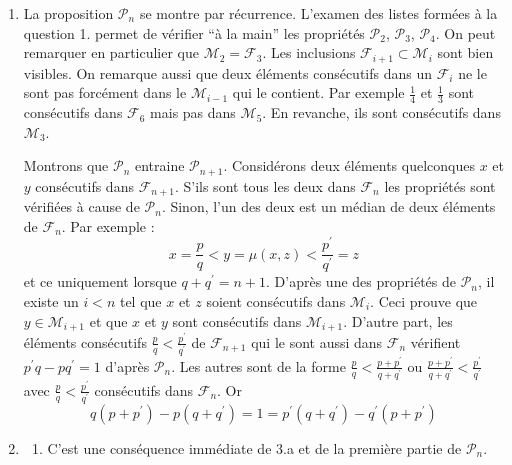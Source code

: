 \begin{enumerate}
\item  La proposition $\mathcal P_n$ se montre par récurrence. \newline
L'examen des listes formées à la question 1. permet de vérifier ``à la main'' les propriétés $\mathcal P_2$, $\mathcal P_3$, $\mathcal P_4$. On peut remarquer en particulier que $\mathcal M_2 = \mathcal F_3$. Les inclusions $\mathcal F_{i+1} \subset \mathcal M_i$ sont bien visibles. On remarque aussi que deux éléments consécutifs dans un $\mathcal F_i$ ne le sont pas forcément dans le $\mathcal M_{i-1}$ qui le contient. Par exemple $\frac{1}{4}$ et $\frac{1}{3}$ sont consécutifs dans $\mathcal F_6$ mais pas dans $\mathcal M_5$. En revanche, ils sont consécutifs dans $\mathcal M_3$.

Montrons que $\mathcal P_n$ entraine $\mathcal P_{n+1}$.\newline
Considérons deux éléments quelconques $x$ et $y$ consécutifs dans $\mathcal F_{n+1}$.\newline
S'ils sont tous les deux dans $\mathcal F_n$ les propriétés sont vérifiées à cause de $\mathcal P_n$.\newline 
Sinon, l'un des deux est un médian de deux éléments de $\mathcal F_n$. Par exemple :
\begin{displaymath}
 x=\frac{p}{q} < y=\mu(x,z) < \frac{p^{\prime }}{q^{\prime }}=z
\end{displaymath}
et ce uniquement lorsque $q+q^{\prime}=n+1$.\newline
D'après une des propriétés de $\mathcal P_n$, il existe un $i<n$ tel que $x$ et $z$ soient consécutifs dans $\mathcal M_i$. Ceci prouve que $y \in  \mathcal{M}_{i+1}$ et que $x$ et $y$ sont consécutifs dans $\mathcal M_{i+1}$.\newline
D'autre part, les {\'e}l{\'e}ments cons{\'e}cutifs $\frac{p}{q}<\frac{p^{\prime }}{q^{\prime }}$ de $\mathcal{F}_{n+1}$ qui le sont aussi dans $\mathcal{F}_{n}$ v{\'e}rifient $p^{\prime }q-pq^{\prime }=1$ d'apr{\`e}s $\mathcal{P}_{n}$. Les autres sont de la forme $\frac{p}{q}<\frac{p+p^{\prime}}{q+q^{\prime }}$ ou $\frac{p+p^{\prime }}{q+q^{\prime }}<\frac{p^{\prime }}{q^{\prime }}$ avec $\frac{p}{q}<\frac{p^{\prime }}{q^{\prime }}$ cons{\'e}cutifs dans $\mathcal{F}_{n}$. Or
\begin{displaymath}
 q(p+p^{\prime })-p(q+q^{\prime })=1=p^{\prime }(q+q^{\prime })-q^{\prime}(p+p^{\prime })
\end{displaymath}
\item
\begin{enumerate}
\item  C'est une cons{\'e}quence imm{\'e}diate de 3.a et de la premi{\`e}re
partie de $\mathcal{P}_{n}$.


\end{enumerate}
\end{enumerate}
